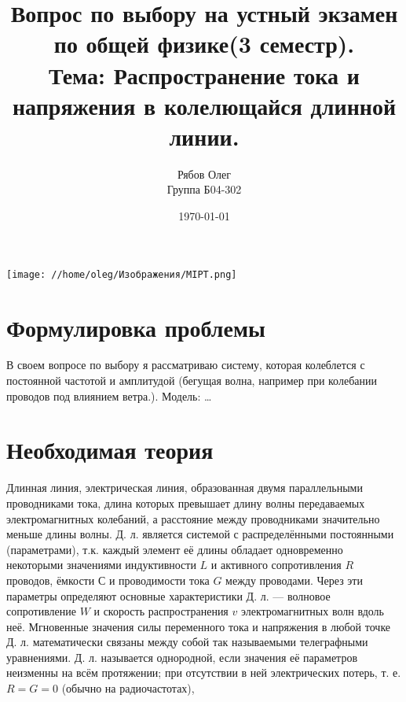 \documentclass[a4paper, 12pt]{article}
\begin{document}
\begin{titlepage}
    \title{Вопрос по выбору на устный экзамен\\
    по общей физике(3 семестр).\\
    Тема: Распространение тока и напряжения в колелющайся длинной линии.
    }
    \author{Рябов Олег \\
    Группа Б04-302}
    \date{\today}
    \maketitle
    \vfill
    \begin{center}
        \texttt{[image: //home/oleg/Изображения/MIPT.png]}
    \end{center}
\end{titlepage}

\setcounter{page}{2}
\tableofcontents
\newpage

\section{Формулировка проблемы}
В своем вопросе по выбору я рассматриваю систему, которая колеблется с постоянной частотой и амплитудой (бегущая волна, например при колебании проводов под влиянием ветра.).
Модель:
\dots

\section{Необходимая теория}
Длинная линия, электрическая линия, образованная двумя параллельными проводниками тока, длина которых превышает длину волны передаваемых электромагнитных колебаний, а расстояние между проводниками значительно меньше длины волны. Д. л. является системой с распределёнными постоянными (параметрами), т.к. каждый элемент её длины обладает одновременно некоторыми значениями индуктивности $L$ и активного сопротивления $R$ проводов, ёмкости $С$ и проводимости тока $G$ между проводами. Через эти параметры определяют основные характеристики Д. л. — волновое сопротивление $W$ и скорость распространения $v$ электромагнитных волн вдоль неё. Мгновенные значения силы переменного тока и напряжения в любой точке Д. л. математически связаны между собой так называемыми телеграфными уравнениями. Д. л. называется однородной, если значения её параметров неизменны на всём протяжении; при отсутствии в ней электрических потерь, т. е. $R = G = 0$ (обычно на радиочастотах),
\end{document}
